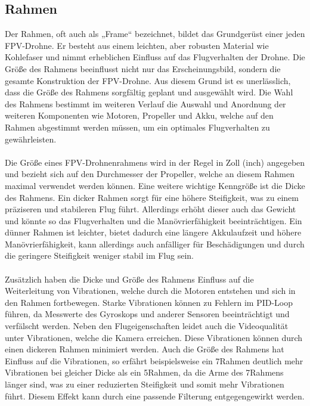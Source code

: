     \subsection[Rahmen]{Rahmen}
        Der Rahmen, oft auch als „Frame“ bezeichnet, bildet das Grundgerüst einer jeden FPV-Drohne.
        Er besteht aus einem leichten, aber robusten Material wie Kohlefaser und nimmt erheblichen
        Einfluss auf das Flugverhalten der Drohne. Die Größe des Rahmens beeinflusst nicht nur das
        Erscheinungsbild, sondern die gesamte Konstruktion der FPV-Drohne. Aus diesem Grund ist es
        unerlässlich, dass die Größe des Rahmens sorgfältig geplant und ausgewählt wird. Die Wahl
        des Rahmens bestimmt im weiteren Verlauf die Auswahl und Anordnung der weiteren Komponenten
        wie Motoren, Propeller und Akku, welche auf den Rahmen abgestimmt werden müssen, um ein
        optimales Flugverhalten zu gewährleisten. \\
        \\
        Die Größe eines FPV-Drohnenrahmens wird in der Regel in Zoll (inch) angegeben und bezieht
        sich auf den Durchmesser der Propeller, welche an diesem Rahmen maximal verwendet werden
        können. Eine weitere wichtige Kenngröße ist die Dicke des Rahmens. Ein dicker Rahmen sorgt
        für eine höhere Steifigkeit, was zu einem präziseren und stabileren Flug führt. Allerdings
        erhöht dieser auch das Gewicht und könnte so das Flugverhalten und die Manövrierfähigkeit
        beeinträchtigen. Ein dünner Rahmen ist leichter, bietet dadurch eine längere Akkulaufzeit
        und höhere Manövrierfähigkeit, kann allerdings auch anfälliger für Beschädigungen und durch
        die geringere Steifigkeit weniger stabil im Flug sein. \\
        \\
        Zusätzlich haben die Dicke und Größe des Rahmens Einfluss auf die Weiterleitung von
        Vibrationen, welche durch die Motoren entstehen und sich in den Rahmen fortbewegen. Starke
        Vibrationen können zu Fehlern im PID-Loop führen, da Messwerte des Gyroskops und anderer
        Sensoren beeinträchtigt und verfälscht werden. Neben den Flugeigenschaften leidet auch die
        Videoqualität unter Vibrationen, welche die Kamera erreichen. Diese Vibrationen können durch
        einen dickeren Rahmen minimiert werden. Auch die Größe des Rahmens hat Einfluss auf die
        Vibrationen, so erfährt beispielsweise ein 7\dq Rahmen deutlich mehr Vibrationen bei gleicher
        Dicke als ein 5\dq Rahmen, da die Arme des 7\dq Rahmens länger sind, was zu einer reduzierten
        Steifigkeit und somit mehr Vibrationen führt. Diesem Effekt kann durch eine passende Filterung
        entgegengewirkt werden.

